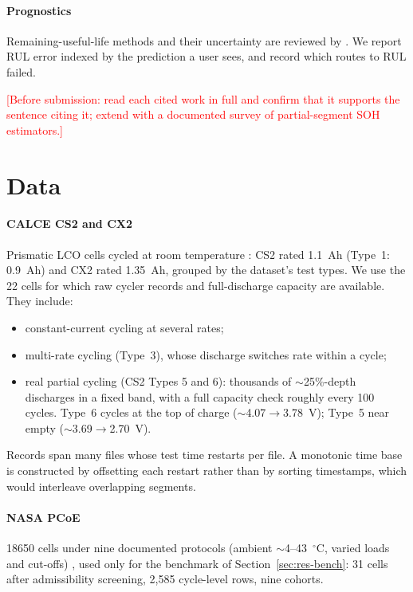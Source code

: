 \documentclass[preprint,12pt,authoryear]{elsarticle}
\begin{document}
\paragraph{Prognostics}
Remaining-useful-life methods and their uncertainty are reviewed by
\citet{hu2020}. We report RUL error indexed by the prediction a user sees, and
record which routes to RUL failed.

\noindent\textcolor{red}{[Before submission: read each cited work in full and
confirm that it supports the sentence citing it; extend with a documented
survey of partial-segment SOH estimators.]}

\section{Data}
\label{sec:data}

\paragraph{CALCE CS2 and CX2}
Prismatic LCO cells cycled at room temperature \citep{calce}: CS2 rated
1.1~Ah (Type~1: 0.9~Ah) and CX2 rated 1.35~Ah, grouped by the dataset's test
types. We use the 22 cells for which raw cycler records and full-discharge
capacity are available. They include:
\begin{itemize}
\item constant-current cycling at several rates;
\item multi-rate cycling (Type~3), whose discharge switches rate within a cycle;
\item real partial cycling (CS2 Types 5 and 6): thousands of ${\sim}$25\%-depth
discharges in a fixed band, with a full capacity check roughly every 100
cycles. Type~6 cycles at the top of charge (${\sim}$4.07$\to$3.78~V); Type~5
near empty (${\sim}$3.69$\to$2.70~V).
\end{itemize}
Records span many files whose test time restarts per file. A monotonic time base
is constructed by offsetting each restart rather than by sorting timestamps,
which would interleave overlapping segments.

\paragraph{NASA PCoE}
18650 cells under nine documented protocols (ambient ${\sim}$4--43~$^\circ$C,
varied loads and cut-offs) \citep{saha2007}, used only for the benchmark of
Section~\ref{sec:res-bench}: 31 cells after admissibility screening, 2{,}585
cycle-level rows, nine cohorts.
\end{document}
